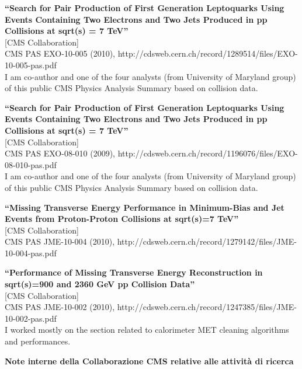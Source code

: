 \documentclass[10pt, a4paper]{article}
\begin{document}
\begin{thebibliography}{599}
{\bf ``Search for Pair Production of First Generation Leptoquarks Using Events Containing Two Electrons and Two Jets Produced in pp Collisions at sqrt(s) = 7 TeV''}
  \\{}[CMS Collaboration]
  \\{}CMS PAS EXO-10-005 (2010), http://cdsweb.cern.ch/record/1289514/files/EXO-10-005-pas.pdf 
  \\I am co-author and one of the four analysts (from University of Maryland group) of this public CMS Physics Analysis Summary based on collision data.

{\bf ``Search for Pair Production of First Generation Leptoquarks Using Events Containing Two Electrons and Two Jets Produced in pp Collisions at sqrt(s) = 7 TeV''}
  \\{}[CMS Collaboration]
  \\{}CMS PAS EXO-08-010 (2009), http://cdsweb.cern.ch/record/1196076/files/EXO-08-010-pas.pdf
  \\I am co-author and one of the four analysts (from University of Maryland group) of this public CMS Physics Analysis Summary based on collision data.

{\bf ``Missing Transverse Energy Performance in Minimum-Bias and Jet Events from Proton-Proton Collisions at sqrt(s)=7 TeV''}
  \\{}[CMS Collaboration]
  \\{}CMS PAS JME-10-004 (2010), http://cdsweb.cern.ch/record/1279142/files/JME-10-004-pas.pdf 

{\bf ``Performance of Missing Transverse Energy Reconstruction in sqrt(s)=900 and 2360 GeV pp Collision Data''}
  \\{}[CMS Collaboration]
  \\{}CMS PAS JME-10-002 (2010), http://cdsweb.cern.ch/record/1247385/files/JME-10-002-pas.pdf 
  \\ I worked mostly on the section related to calorimeter MET cleaning algorithms and performances.

\vspace{0.1cm} \begin{center} \textbf{Note interne della Collaborazione CMS relative alle attivit\`a di ricerca} \end{center} \vspace{0.05cm}


\end{thebibliography}
\end{document}
